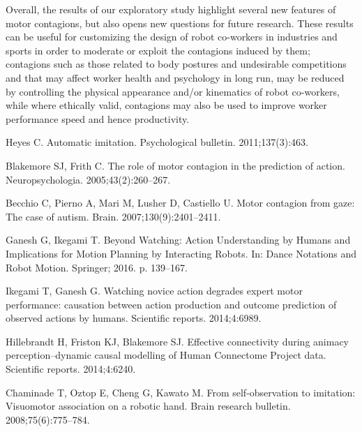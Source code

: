 Overall, the results of our exploratory study highlight several new features of motor contagions, but also opens new questions for future research. These results can be useful for customizing the design of robot co-workers in industries and sports in order to moderate or exploit the contagions induced by them; contagions such as those related to body postures and undesirable competitions and that may affect worker health and psychology in long run, may be reduced by controlling the physical appearance and/or kinematics of robot co-workers, while where ethically valid, contagions may also be used to improve worker performance speed and hence productivity.








\begin{thebibliography}{10}
	
	Heyes C.
	\newblock Automatic imitation.
	\newblock Psychological bulletin. 2011;137(3):463.
	
	Blakemore SJ, Frith C.
	\newblock The role of motor contagion in the prediction of action.
	\newblock Neuropsychologia. 2005;43(2):260--267.
	
	Becchio C, Pierno A, Mari M, Lusher D, Castiello U.
	\newblock Motor contagion from gaze: The case of autism.
	\newblock Brain. 2007;130(9):2401--2411.
	
	Ganesh G, Ikegami T.
	\newblock Beyond Watching: Action Understanding by Humans and Implications for
	Motion Planning by Interacting Robots.
	\newblock In: Dance Notations and Robot Motion. Springer; 2016. p. 139--167.
	
	Ikegami T, Ganesh G.
	\newblock Watching novice action degrades expert motor performance: causation
	between action production and outcome prediction of observed actions by
	humans.
	\newblock Scientific reports. 2014;4:6989.
	
	Hillebrandt H, Friston KJ, Blakemore SJ.
	\newblock Effective connectivity during animacy perception--dynamic causal
	modelling of Human Connectome Project data.
	\newblock Scientific reports. 2014;4:6240.
	
	Chaminade T, Oztop E, Cheng G, Kawato M.
	\newblock From self-observation to imitation: Visuomotor association on a
	robotic hand.
	\newblock Brain research bulletin. 2008;75(6):775--784.
	

\end{thebibliography}
